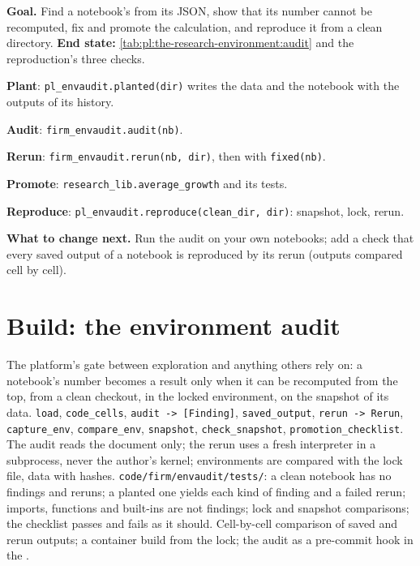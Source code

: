 \begin{tutorial}
\textbf{Goal.} Find a notebook's  from its JSON, show that its number cannot be recomputed, fix and promote the calculation, and
reproduce it from a clean directory. \textbf{End state:} \cref{tab:pl:the-research-environment:audit} and the reproduction's three checks.
\begin{tutsteps}
\item \textbf{Plant}: \texttt{pl\_envaudit.planted(dir)} writes the data and the notebook with the outputs of its history.
\item \textbf{Audit}: \texttt{firm\_envaudit.audit(nb)}.
\item \textbf{Rerun}: \texttt{firm\_envaudit.rerun(nb, dir)}, then with \texttt{fixed(nb)}.
\item \textbf{Promote}: \texttt{research\_lib.average\_growth} and its tests.
\item \textbf{Reproduce}: \texttt{pl\_envaudit.reproduce(clean\_dir, dir)}: snapshot, lock, rerun.
\end{tutsteps}
\textbf{What to change next.} Run the audit on your own notebooks; add a check that every saved output of a notebook is reproduced by its rerun
(outputs compared cell by cell).
\end{tutorial}

\section{Build: the environment audit}\label{bld:pl:the-research-environment:envaudit}

\begin{build}
 The platform's gate between exploration and anything others rely on: a notebook's number becomes a result only when it can
be recomputed from the top, from a clean checkout, in the locked environment, on the snapshot of its data.
 \texttt{load}, \texttt{code\_cells}, \texttt{audit -> [Finding]}, \texttt{saved\_output}, \texttt{rerun -> Rerun},
\texttt{capture\_env}, \texttt{compare\_env}, \texttt{snapshot}, \texttt{check\_snapshot}, \texttt{promotion\_checklist}.
 The audit reads the document only; the rerun uses a fresh interpreter in a subprocess, never the author's kernel; environments
are compared with the lock file, data with hashes.
 \texttt{code/firm/envaudit/tests/}: a clean notebook has no findings and reruns; a planted one yields each kind of
finding and a failed rerun; imports, functions and built-ins are not findings; lock and snapshot comparisons; the checklist passes and fails
as it should.
 Cell-by-cell comparison of saved and rerun outputs; a container build from the lock; the audit as a pre-commit hook in the
.
\end{build}

